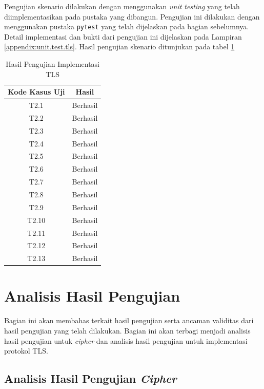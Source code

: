 Pengujian skenario dilakukan dengan menggunakan \emph{unit testing} yang telah diimplementasikan pada pustaka yang dibangun. Pengujian ini dilakukan dengan menggunakan pustaka \texttt{pytest} yang telah dijelaskan pada bagian sebelumnya. Detail implementasi dan bukti dari pengujian ini dijelaskan pada Lampiran \ref{appendix:unit.test.tls}. Hasil pengujian skenario ditunjukan pada tabel \ref{tab:test.result.tls}

\begin{table}[!h]
  \centering
  \caption{Hasil Pengujian Implementasi TLS} \label{tab:test.result.tls}
  \begin{tabular}{|c|c|}
    \hline
    \textbf{Kode Kasus Uji} & \textbf{Hasil} \\ \hline
    T2.1 & Berhasil \\ \hline
    T2.2 & Berhasil \\ \hline
    T2.3 & Berhasil \\ \hline
    T2.4 & Berhasil \\ \hline
    T2.5 & Berhasil \\ \hline
    T2.6 & Berhasil \\ \hline
    T2.7 & Berhasil \\ \hline
    T2.8 & Berhasil \\ \hline
    T2.9 & Berhasil \\ \hline
    T2.10 & Berhasil \\ \hline
    T2.11 & Berhasil \\ \hline
    T2.12 & Berhasil \\ \hline
    T2.13 & Berhasil \\ \hline
  \end{tabular}
\end{table}

\section{Analisis Hasil Pengujian} 
\label{sec:analisis-hasil-pengujian}

Bagian ini akan membahas terkait hasil pengujian serta ancaman validitas dari hasil pengujian yang telah dilakukan. Bagian ini akan terbagi menjadi analisis hasil pengujian untuk \emph{cipher} dan analisis hasil pengujian untuk implementasi protokol TLS.

\subsection{Analisis Hasil Pengujian \emph{Cipher}}

